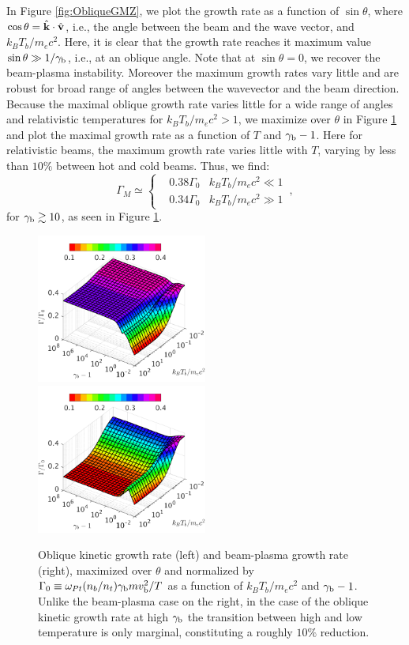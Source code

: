 \documentclass[usenatbib,iop,apj,numberedappendix]{aeb_emulateapj_2015}
\newcommand\bmath[1] {\mbox{\boldmath$\rm #1$}}
\newcommand{\vel}{\ensuremath{\bmath{v}}}
\newcommand{\kvec}{\ensuremath{\bmath{k}}}
\newcommand{\gammabeam}{\ensuremath{\gamma_{\rm b}}}
\newcommand{\vbeam}{\ensuremath{v_{\rm b}}}
\begin{document}
In Figure \ref{fig:ObliqueGMZ}, we plot the growth rate as a function of
$\sin\theta$, where $\cos\theta = \hat{\kvec}\cdot\hat{\vel}$, i.e., the angle between the
beam and the wave vector, and $k_BT_b/m_e c^2$.  Here, it is clear that the growth
rate reaches it maximum value $\sin\theta \gg 1/\gammabeam$, i.e., at an oblique angle.  Note that at $\sin\theta = 0$, we recover the beam-plasma instability.  Moreover the maximum growth rates vary little and are
robust for broad range of angles between the wavevector and the beam direction.
Because the maximal oblique growth rate varies little for a wide range of angles
and relativistic temperatures for $k_B T_b/m_ec^2 > 1$, we maximize over $\theta$
in Figure \ref{fig:OGgen} and plot the maximal growth rate as a function of $T$
and $\gammabeam - 1$.  Here for relativistic beams, the maximum growth rate varies
little with $T$, varying by less than $10\%$ between hot and cold beams.  Thus,
we find:
\begin{equation}
\Gamma_M
\simeq
\left\{
\begin{aligned}
& 0.38 \Gamma_0 & k_BT_b/m_ec^2\ll 1\\
& 0.34 \Gamma_0 & k_BT_b/m_ec^2\gg 1
\end{aligned}
\right.\,,
\end{equation}
for $\gammabeam\gtrsim10$, as seen in Figure \ref{fig:OGgen}.  

\begin{figure}
\includegraphics[width=0.5\textwidth]{pp2.pdf}
\includegraphics[width=0.5\textwidth]{pp3.pdf}

\caption{Oblique kinetic growth rate (left) and beam-plasma growth rate (right),
  maximized over $\theta$ and normalized by
  $\Gamma_0\equiv\omega_{Pt}(n_b/n_t)\gammabeam m \vbeam^2/T$ as a function of
  $k_BT_b/m_ec^2$ and $\gammabeam-1$.  Unlike the beam-plasma case on the right, in the case of the
    oblique kinetic growth rate at high $\gammabeam$ the transition between high
    and low temperature is only marginal, constituting a roughly $10\%$
    reduction. } \label{fig:OGgen}
\end{figure}
\end{document}

